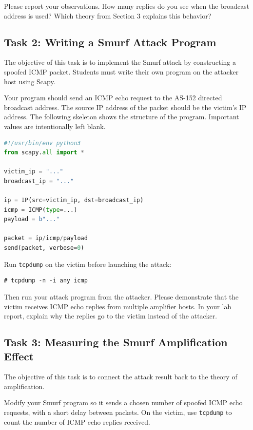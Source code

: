 Please report your observations. How many replies do you see when the
broadcast address is used? Which theory from Section 3 explains this behavior?


\subsection{Task 2: Writing a Smurf Attack Program}

The objective of this task is to implement the Smurf attack by constructing a
spoofed ICMP packet. Students must write their own program on the attacker host
using Scapy.

Your program should send an ICMP echo request to the AS-152 directed broadcast
address. The source IP address of the packet should be the victim's IP address.
The following skeleton shows the structure of the program. Important values are
intentionally left blank.

\begin{lstlisting}[language=python]
#!/usr/bin/env python3
from scapy.all import *

victim_ip = "..."
broadcast_ip = "..."

ip = IP(src=victim_ip, dst=broadcast_ip)
icmp = ICMP(type=...)
payload = b"..."

packet = ip/icmp/payload
send(packet, verbose=0)
\end{lstlisting}

Run \texttt{tcpdump} on the victim before launching the attack:

\begin{lstlisting}
# tcpdump -n -i any icmp
\end{lstlisting}

Then run your attack program from the attacker. Please demonstrate that the
victim receives ICMP echo replies from multiple amplifier hosts. In your lab
report, explain why the replies go to the victim instead of the attacker.


\subsection{Task 3: Measuring the Smurf Amplification Effect}

The objective of this task is to connect the attack result back to the theory of
amplification.

Modify your Smurf program so it sends a chosen number of spoofed ICMP echo
requests, with a short delay between packets. On the victim, use
\texttt{tcpdump} to count the number of ICMP echo replies received.

